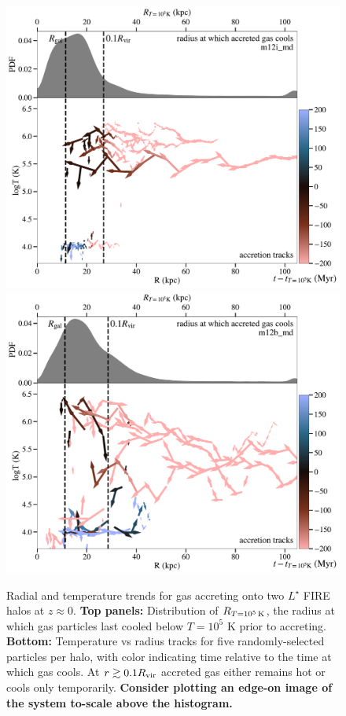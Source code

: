 \documentclass[fleqn,usenatbib]{mnras}
\newcommand{\Rcon}{R_{T=10^5\,{\rm K}}}
\begin{document}
\begin{figure}
    \centering
    \includegraphics[width=\columnwidth]{figures/tracks/tracks_m12i_md.pdf}
    \includegraphics[width=\columnwidth]{figures/tracks/tracks_m12b_md.pdf}
    \caption{
    Radial and temperature trends for gas accreting onto two $L^\star$ FIRE halos at $z\approx0$.
    \textbf{Top panels:} Distribution of $\Rcon$, the radius at which gas particles last cooled below $T=10^5$ K prior to accreting.
    \textbf{Bottom:} Temperature vs radius tracks for five randomly-selected particles per halo, with color indicating time relative to the time at which gas cools.
    At $r \gtrsim 0.1 R_{\rm vir}$ accreted gas either remains hot or cools only temporarily.
    \textbf{
    Consider plotting an edge-on image of the system to-scale above the histogram.
    }
    }
    \label{f: T vs R}
\end{figure}
\end{document}
